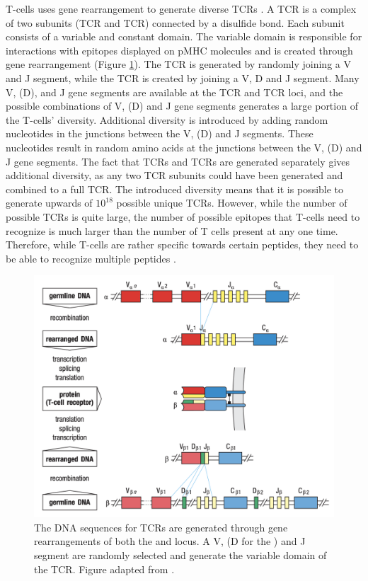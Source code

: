 T-cells uses gene rearrangement to generate diverse TCRs \cite{Krogsgaard2005HowAntigen, Davis1988T-cellRecognition}. A TCR is a complex of two subunits (TCR{\textalpha} and TCR{\textbeta}) connected by a disulfide bond. Each subunit consists of a variable and constant domain. The variable domain is responsible for interactions with epitopes displayed on pMHC molecules and is created through gene rearrangement (Figure \ref{fig:tcr_generation}). The TCR{\textalpha} is generated by randomly joining a V and J segment, while the TCR{\textbeta} is created by joining a V, D and J segment. Many V, (D), and J gene segments are available at the TCR{\textalpha} and TCR{\textbeta} loci, and the possible combinations of V, (D) and J gene segments generates a large portion of the T-cells' diversity. Additional diversity is introduced by adding random nucleotides in the junctions between the V, (D) and J segments. These nucleotides result in random amino acids at the junctions between the V, (D) and J gene segments. The fact that TCR{\textalpha}s and TCR{\textbeta}s are generated separately gives additional diversity, as any two TCR subunits could have been generated and combined to a full TCR. The introduced diversity means that it is possible to generate upwards of $10^{18}$ possible unique TCRs. However, while the number of possible TCRs is quite large, the number of possible epitopes that T-cells need to recognize is much larger than the number of T cells present at any one time. Therefore, while T-cells are rather specific towards certain peptides, they need to be able to recognize multiple peptides \cite{Sewell2012WhyCross-reactive, Glanville2017IdentifyingRepertoire}.

\begin{figure}
    \centering
    \includegraphics[width=0.8\linewidth]{figures/tcr_generation.png}
    \caption{The DNA sequences for TCRs are generated through gene rearrangements of both the {\textalpha} and {\textbeta} locus. A V, (D for the {\textbeta}) and J segment are randomly selected and generate the variable domain of the TCR. Figure adapted from \cite{Murphy2008JanewaysImmunobiology}.}
    \label{fig:tcr_generation}
\end{figure}

